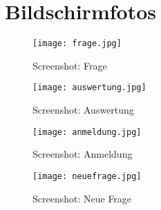 \appendix 
{} 
\section{Bildschirmfotos}

\begin{figure}[h]
\texttt{[image: frage.jpg]}
\caption{Screenshot: Frage}
\label{scr:frage}
\end{figure}

\begin{figure}[h]
\texttt{[image: auswertung.jpg]}
\caption{Screenshot: Auswertung}
\label{scr:auswertung}
\end{figure}

\begin{figure}[h]
\texttt{[image: anmeldung.jpg]}
\caption{Screenshot: Anmeldung}
\label{scr:anmeldung}
\end{figure}

\begin{figure}[h]
\texttt{[image: neuefrage.jpg]}
\caption{Screenshot: Neue Frage}
\label{scr:neuefrage}
\end{figure}
